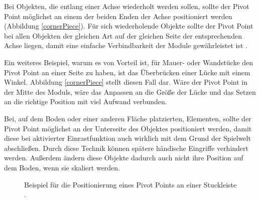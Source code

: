 \vspace{-10.5pt}
Bei Objekten, die entlang einer Achse wiederholt werden sollen, sollte der Pivot Point möglichst an einem der beiden Enden der Achse positioniert werden (Abbildung \ref{cornerPiece}). \parencite{Mader}
\enlargethispage{10.5pt}
\newpage
Für sich wiederholende Objekte sollte der Pivot Point bei allen Objekten der gleichen Art auf der gleichen Seite der entsprechenden Achse liegen, damit eine einfache Verbindbarkeit der Module gewährleistet ist \parencite{Mader}.
\par
Ein weiteres Beispiel, warum es von Vorteil ist, für Mauer- oder Wandstücke den Pivot Point an einer Seite zu haben, ist das Überbrücken einer Lücke mit einem Winkel. Abbildung \ref{cornerPiece} stellt diesen Fall dar. Wäre der Pivot Point in der Mitte des Moduls, wäre das Anpassen an die Größe der Lücke und das Setzen an die richtige Position mit viel Aufwand verbunden. \parencite{Perry}
\par
Bei, auf dem Boden oder einer anderen Fläche platzierten, Elementen, sollte der Pivot Point möglichst an der Unterseite des Objektes positioniert werden, damit diese bei aktivierter Einrastfunktion auch wirklich mit dem Grund der Spielwelt abschließen. Durch diese Technik können spätere händische Eingriffe verhindert werden. Außerdem ändern diese Objekte dadurch auch nicht ihre Position auf dem Boden, wenn sie skaliert werden. \parencite{Mader}
\begin{figure}[H]
\centering
  \caption{Beispiel für die Positionierung eines Pivot Points an einer Stuckleiste \parencite{Mader}.}
	\label{stuck}
\end{figure}
\vspace{-10.5pt}
